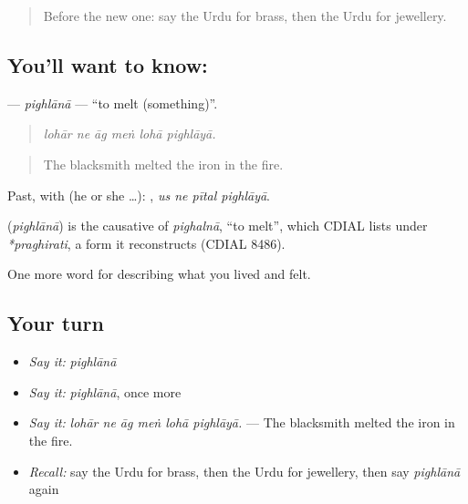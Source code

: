 \label{lesson:UR-C501-pighlana}



\begin{quote}
Before the new one: say the Urdu for brass, then the Urdu for jewellery.
\end{quote}

\subsection*{You'll want to know: }
\textbf{} — \emph{pighlānā} — \textquotedblleft{}to melt (something)\textquotedblright{}.

\begin{quote}
     
\end{quote}

\begin{quote}
\emph{lohār ne āg meṅ lohā pighlāyā.}
\end{quote}

\begin{quote}
The blacksmith melted the iron in the fire.
\end{quote}

Past, with  (he or she …):    , \emph{us ne pītal pighlāyā}.

\begin{cousinweb}
\textbf{} (\emph{pighlānā}) is the causative of \emph{pighalnā}, \textquotedblleft{}to melt\textquotedblright{}, which CDIAL lists under \emph{*praghirati}, a form it reconstructs (CDIAL 8486).
\end{cousinweb}

\begin{grammarlens}[title={What you've built}]
One more word for describing what you lived and felt.
\end{grammarlens}

\subsection*{Your turn}
\begin{itemize}
\raggedright
  \item \emph{Say it:} \emph{pighlānā}
  \item \emph{Say it:} \emph{pighlānā}, once more
  \item \emph{Say it:} \emph{lohār ne āg meṅ lohā pighlāyā.} — The blacksmith melted the iron in the fire.
  \item \emph{Recall:} say the Urdu for brass, then the Urdu for jewellery, then say \emph{pighlānā} again
\end{itemize}

